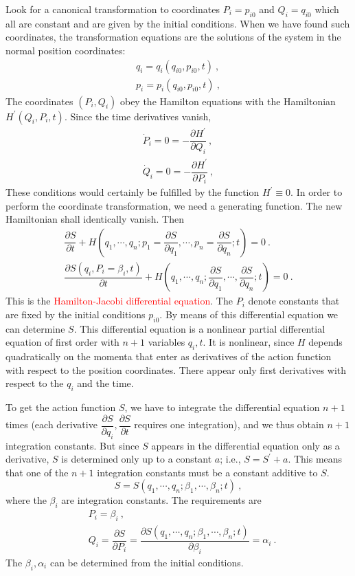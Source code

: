 \documentclass[11pt,a4paper]{article}
\begin{document}
\cite{greiner2009classical} Look for a canonical transformation to coordinates $P_i = p_{i0}$ and $Q_i = q_{i0}$ which all are constant and are given by the initial conditions. When we have found such coordinates, the transformation equations are the solutions of the system in the normal position coordinates:
\begin{align*}
q_i = q_i(q_{i0}, p_{i0}, t) ~, \\
p_i = p_i(q_{i0}, p_{i0}, t) ~, 
\end{align*}
The coordinates $(P_i, Q_i)$ obey the Hamilton equations with the Hamiltonian $H^\prime(Q_i, P_i, t)$. Since the time derivatives vanish, 
\begin{align*}
\dot{P}_i = 0 = - \dfrac{\partial H^\prime}{\partial Q_i} ~, \\
\dot{Q}_i = 0 = - \dfrac{\partial H^\prime}{\partial P_i} ~, 
\end{align*}
These conditions would certainly be fulfilled by the function $H^\prime \equiv 0$. In order to perform the coordinate transformation, we need a generating function. The new Hamiltonian shall identically vanish. Then
\begin{align}
\dfrac{\partial S}{\partial t} +H\left(q_1, \cdots, q_n; p_1 = \dfrac{\partial S}{\partial q_1}, \cdots, p_n = \dfrac{\partial S}{\partial q_n}; t \right) = 0 ~. \\
\dfrac{\partial S(q_i, P_i = \beta_i, t)}{\partial t} +H\left(q_1, \cdots, q_n; \dfrac{\partial S}{\partial q_1}, \cdots, \dfrac{\partial S}{\partial q_n}; t \right) = 0 ~.
\end{align}
This is the \textcolor{red}{Hamilton-Jacobi differential equation}. The $P_i$ denote constants that are fixed by the initial conditions $p_{i0}$. By means of this differential equation we can determine $S$. This differential equation is a nonlinear partial differential equation of first order with $n + 1$ variables $q_i, t$. It is nonlinear, since $H$ depends quadratically on the momenta that enter as derivatives of the action function with respect to the position coordinates. There appear only first derivatives with respect to the $q_i$ and the time.

To get the action function $S$, we have to integrate the differential equation $n + 1$ times (each derivative $\dfrac{\partial S}{\partial q_i}, \dfrac{\partial S}{\partial t}$ requires one integration), and we thus obtain $n + 1$ integration constants. But since $S$ appears in the differential equation only as a derivative, $S$ is determined only up to a constant $a$; i.e., $S = S^\prime + a$. This means that one of the $n + 1$ integration constants must be a constant additive to $S$.
\begin{equation*}
S = S(q_1, \cdots, q_n; \beta_1, \cdots, \beta_n; t) ~,
\end{equation*}
where the $\beta_i$ are integration constants.  The requirements are
\begin{align}
& P_i = \beta_i ~, \\
& Q_i = \dfrac{\partial S}{\partial P_i} = \dfrac{\partial S(q_1, \cdots, q_n; \beta_1, \cdots, \beta_n; t)}{\partial \beta_i} = \alpha_i ~.
\end{align}
The $\beta_i, \alpha_i$ can be determined from the initial conditions.
\end{document}

